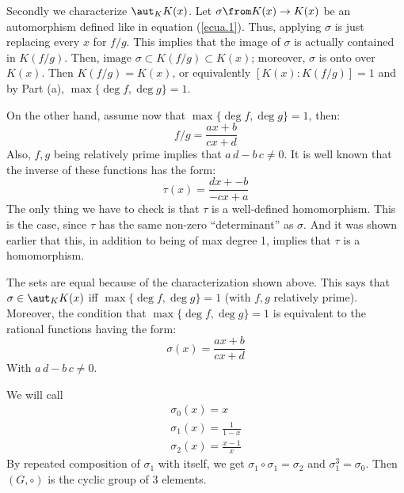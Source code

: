 Secondly we characterize  $\aut_K K(x)$.
Let $\sigma \from K(x) \to K(x)$ be an automorphism defined like in equation (\ref{ecua.1}).
Thus, applying $\sigma$ is just replacing every $x$ for $f/g$.
This implies that the image of $\sigma$ is actually contained in $K(f/g)$. 
Then, $\text{image }\sigma \subset K(f/g) \subset K(x)$; moreover, $\sigma$ is onto over $K(x)$.
Then $K(f/g)=K(x)$, or equivalently $[K(x):K(f/g)]=1$ and by Part (a), $\max\{ \deg f, \deg g\}=1$.

On the other hand, assume now that $\max\{ \deg f, \deg g\}=1$, then:
$$f/g= \frac{ax+b}{cx+d}$$
Also, $f,g$ being relatively prime implies that $a\,d- b\,c\neq 0$. 
It is well known that the inverse of these functions has the form:
$$\tau(x) = \frac{dx+-b}{-cx+a}$$
The only thing we have to check is that $\tau$ is a well-defined homomorphism.
This is the case, since  $\tau$ has the same non-zero ``determinant'' as $\sigma$.
And it was shown earlier that this, in addition to being of max degree 1, implies that $\tau$ is a homomorphism.

The sets are equal because of the characterization shown above. 
This says that $\sigma\in \aut_K K(x)$ iff $\max\{ \deg f, \deg g\}=1$ (with $f,g$ relatively prime).
Moreover,  the condition that $\max\{ \deg f, \deg g\}=1$ is equivalent to the rational functions having the form:
$$\sigma(x) = \frac{ax+b}{cx+d}$$
With $a\,d- b\,c\neq 0$. 
 
We will call \begin{gather*}
    \sigma_0(x)=x\\
    \sigma_1(x) = \frac 1{1-x}\\
    \sigma_2(x) = \frac{x-1}{x}
\end{gather*}
By repeated composition of $\sigma_1$ with itself, we get $\sigma_1\circ \sigma_1=\sigma_2$ and $\sigma_1^3=\sigma_0$. 
Then $(G,\circ)$ is the cyclic group of 3 elements.

